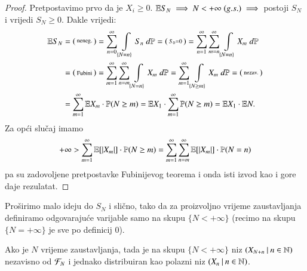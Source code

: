 \begin{proof}
    Pretpostavimo prvo da je $X_i \geq 0$.
    $\mathbb{E} S_N \implies N < +\infty \; (g.s.) \implies$ postoji $S_N$ i vrijedi $S_N \geq 0$.
    Dakle vrijedi:
    \begin{equation*}
        \begin{aligned}
            \mathbb{E} S_N &=
            \begin{psmallmatrix}
                \textnormal{neneg.}
            \end{psmallmatrix}
            = \sum\limits_{n = 0}^{\infty} \int\limits_{\{ N = n \}} S_n \; d \mathbb{P} =
            \begin{psmallmatrix}
                S_0 = 0
            \end{psmallmatrix}
            = \sum\limits_{n = 1}^{\infty} \sum\limits_{m = n}^{\infty} \int\limits_{\{ N = n \}} X_m \; d \mathbb{P}\\
            &=
            \begin{psmallmatrix}
                \textnormal{Fubini}
            \end{psmallmatrix}
            = \sum\limits_{m = 1}^{\infty} \sum\limits_{n = m}^{\infty} \int\limits_{\{ N = n \}} X_m \; d \mathbb{P} = \sum\limits_{m = 1}^{\infty} \int\limits_{\{ N \geq m \}} X_m \; d \mathbb{P} =
            \begin{psmallmatrix}
                \textnormal{nezav.}
            \end{psmallmatrix}\\
            &= \sum\limits_{m = 1}^{\infty} \mathbb{E} X_m \cdot \mathbb{P} (N \geq m) = \mathbb{E} X_1 \cdot \sum\limits_{m = 1}^{\infty} \mathbb{P} (N \geq m) = \mathbb{E} X_1 \cdot \mathbb{E} N.
        \end{aligned}
    \end{equation*}
    Za op\' ci slu\v caj imamo
    \begin{equation*}
        + \infty > \sum\limits_{m = 1}^{\infty} \mathbb{E} [| X_m |] \cdot \mathbb{P} (N \geq m) = \sum\limits_{m = 1}^{\infty} \sum\limits_{n = m}^{\infty} \mathbb{E} [|X_m|] \cdot \mathbb{P} (N = n)
    \end{equation*}
    pa su zadovoljene pretpostavke Fubinijevog teorema i onda isti izvod kao i gore daje rezulatat.
\end{proof}

Pro\v sirimo malo ideju do $S_N$ i sli\v cno, tako da za proizvoljno vrijeme zaustavljanja definiramo odgovaraju\' ce varijable samo na skupu $\{ N < + \infty \}$ (recimo na skupu $\{ N = +\infty \}$ je sve po definicij $0$).

\begin{tm} \label{tm:15.10}
    Ako je $N$ vrijeme zaustavljanja, tada je na skupu $\{ N < +\infty \}$ niz $({X_{N + n}} \: | \: {n \in \mathbb{N}})$ nezavisno od $\mathcal{F}_N$ i jednako distribuiran kao polazni niz $({X_n} \: | \: {n \in \mathbb{N}})$.
\end{tm}

